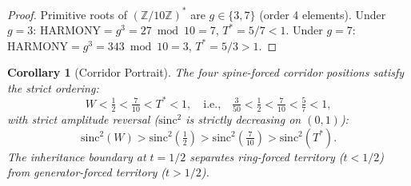 \documentclass{amsart}
\newtheorem{corollary}[theorem]{Corollary}
\begin{document}
\begin{proof}
Primitive roots of $(\mathbb{Z}/10\mathbb{Z})^*$ are $g \in \{3,7\}$ (order 4 elements).
Under $g=3$: $\mathrm{HARMONY} = g^3 = 27 \bmod 10 = 7$, $T^* = 5/7 < 1$. \checkmark
Under $g=7$: $\mathrm{HARMONY} = g^3 = 343 \bmod 10 = 3$, $T^* = 5/3 > 1$. \texttimes
\end{proof}

\begin{corollary}[Corridor Portrait]
The four spine-forced corridor positions satisfy the strict ordering:
\[
  W < \tfrac{1}{2} < \tfrac{7}{10} < T^* < 1,
  \quad \text{i.e.,} \quad
  \tfrac{3}{50} < \tfrac{1}{2} < \tfrac{7}{10} < \tfrac{5}{7} < 1,
\]
with strict amplitude reversal ($\mathrm{sinc}^2$ is strictly decreasing on $(0,1)$):
\[
  \mathrm{sinc}^2(W) > \mathrm{sinc}^2(\tfrac{1}{2}) >
  \mathrm{sinc}^2(\tfrac{7}{10}) > \mathrm{sinc}^2(T^*).
\]
The inheritance boundary at $t=1/2$ separates ring-forced territory ($t < 1/2$)
from generator-forced territory ($t > 1/2$).
\end{corollary}
\end{document}
